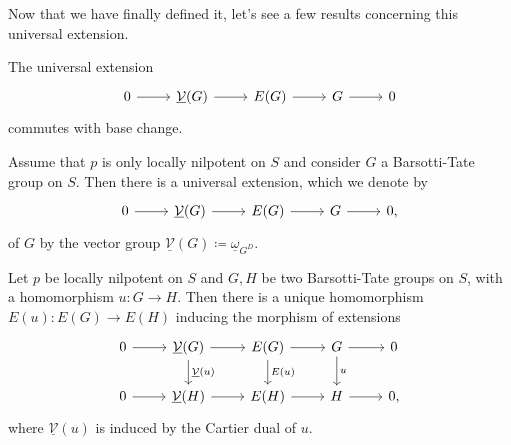 \noindent
Now that we have finally defined it, let's see
a few results concerning this universal extension.


\begin{lem}
	The universal extension 
	\begin{equation*}
	\begin{tikzcd}
		0 \arrow[r, "", rightarrow] &
		\underline{\mathcal{V}}(G) \arrow[r, "", rightarrow] &
		E(G) \arrow[r, "", rightarrow] &
		G \arrow[r, "", rightarrow] &
		0
	\end{tikzcd}
	\end{equation*}
	commutes with base change.
\end{lem} 


\begin{lem}
	Assume that $p$ is only locally nilpotent on $S$
	and consider $G$ a Barsotti-Tate group on $S$.
	Then there is a universal extension, which we denote by
	\begin{equation*}
	\begin{tikzcd}
		0 \arrow[r, "", rightarrow] &
		\underline{\mathcal{V}}(G) \arrow[r, "", rightarrow] &
		E(G) \arrow[r, "", rightarrow] &
		G \arrow[r, "", rightarrow] &
		0
	,\end{tikzcd}
	\end{equation*}
	of $G$ by the vector group
	$\underline{\mathcal{V}}(G) \coloneqq \underline{\omega}_{G^D}$.
\end{lem} 


\begin{prop}\label{prop:MorUnivExts}
	Let $p$ be locally nilpotent on $S$ and $G,H$ be two
	Barsotti-Tate groups on $S$, with a homomorphism $u\colon G \to H$.
	Then there is a unique homomorphism
	$E(u)\colon E(G) \to E(H)$ inducing the morphism of extensions
	\begin{equation*}
	\begin{tikzcd}
		0 \arrow[r, "", rightarrow] &
		\underline{\mathcal{V}}(G) \arrow[r, "", rightarrow] 
		\arrow[d, "\underline{\mathcal{V}}(u)", rightarrow] &
		E(G) \arrow[r, "", rightarrow] 
		\arrow[d, "E(u)", rightarrow] &
		G \arrow[r, "", rightarrow] 
		\arrow[d, "u", rightarrow] &
		0\\
		0 \arrow[r, "", rightarrow] &
		\underline{\mathcal{V}}(H) \arrow[r, "", rightarrow] &
		E(H) \arrow[r, "", rightarrow] &
		H \arrow[r, "", rightarrow] &
		0
	,\end{tikzcd}
	\end{equation*}
	where $\underline{\mathcal{V}}(u)$ is induced by the Cartier dual of $u$.
\end{prop} 


